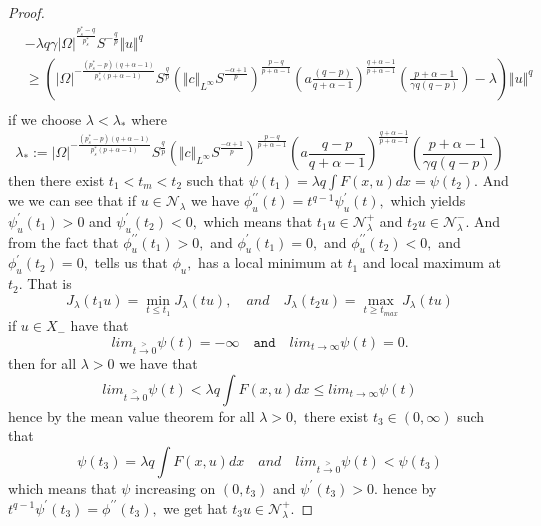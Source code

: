 \documentclass[10pt,twoside,reqno,centertags,draft]{amsart}
\begin{document}
\begin{proof}
{\begin{equation}
\begin{aligned}
& - \lambda q \gamma \vert \Omega \vert^{\frac{p_s^*-q}{p_s^*}}S^{-\frac{q}{p}} \Vert u \Vert^{q}\\ 
&\geq \left(  \vert \Omega \vert^{-\frac{(p_s^*-p)(q +\alpha -1)}{p_s^*(p +\alpha -1)}}S^{\frac{q}{p}}\left( \Vert c \Vert_{L^{\infty}}S^{\frac{-\alpha+1}{p}}\right)^{\frac{p-q}{p+\alpha -1}}\left(a\frac{(q-p)}{q+\alpha-1} \right)^{\frac{q+\alpha-1}{p+\alpha-1}}\left(\frac{p+\alpha -1}{\gamma q (q-p)}\right) - \lambda \right)
 \Vert u \Vert^{q}\\ 
\end{aligned}
\end{equation}
}
if we choose $ \lambda < \lambda_*$ where
\begin{equation*}
\lambda_* :=  \vert \Omega \vert^{-\frac{(p_s^*-p)(q +\alpha -1)}{p_s^*(p +\alpha -1)}}S^{\frac{q}{p}}\left( \Vert c \Vert_{L^{\infty}}S^{\frac{-\alpha+1}{p}}\right)^{\frac{p-q}{p+\alpha -1}}\left(a\frac{q-p}{q+\alpha-1} \right)^{\frac{q+\alpha-1}{p+\alpha-1}}\left(\frac{p+\alpha -1}{\gamma q (q-p)}\right)
\end{equation*}
then there exist $ t_1 < t_m < t_2 $ such that $ \psi(t_1) = \lambda q \int F(x,u) dx = \psi(t_2).$ And we we can see that if $ u \in \mathcal{N}_{\lambda}$ we have $ \phi^{\prime\prime}_{u}(t) =t^{q -1}\psi^{\prime}_{u}(t),$ which yields $ \psi^{\prime}_{u}(t_1) >0$ and $  \psi^{\prime}_{u}(t_2) <0,$ which means that 
$ t_1u \in \mathcal{N}_{\lambda}^{+}$ and $ t_2u \in \mathcal{N}_{\lambda}^{-}.$ And from the fact that $ \phi^{\prime \prime}_{u}(t_1) > 0,$ and $ \phi^{\prime}_{u}(t_1) = 0,$ and $ \phi^{\prime \prime}_{u}(t_2) < 0,$ and $ \phi^{\prime}_{u}(t_2) = 0,$
tells us that $ \phi_{u},$ has a local minimum at $ t_1$ and local maximum at $ t_2.$ That is 
\begin{equation*}
J_{\lambda}(t_1u) =\min_{t \leq t_1}J_{\lambda}(tu), \quad \textit{and} \quad J_{\lambda}(t_2u) =\max_{t \geq t_{max}}J_{\lambda}(tu)
\end{equation*}
if  $u \in  X_-$ have that 
\begin{equation*}
lim_{t \xrightarrow{>} 0}\psi(t) = -\infty \quad  \texttt{and} \quad lim_{t \to \infty}\psi(t) =0.
\end{equation*}
then for all $ \lambda > 0$ we have that
\begin{equation*}
 lim_{t \xrightarrow{>} 0}\psi(t) < \lambda q \int F(x,u) dx \leq  lim_{t \to \infty}\psi(t)
\end{equation*}
hence by the mean value theorem for all $ \lambda > 0,$ there exist $ t_3 \in (0,\infty)$ such that 
\begin{equation*}
\psi(t_3) = \lambda q \int F(x,u) dx \quad \textit{and} \quad  lim_{t \xrightarrow{>} 0}\psi(t) <\psi(t_3)
\end{equation*}
which means that $ \psi$ increasing on $(0, t_3)$ and $ \psi^{\prime}(t_3) > 0.$ hence by $ t^{q-1}\psi^{\prime}(t_3) = \phi^{\prime\prime}(t_3),$ we get hat 
$ t_3 u \in \mathcal{N}_{\lambda}^{+}.$
\end{proof}
\end{document}
